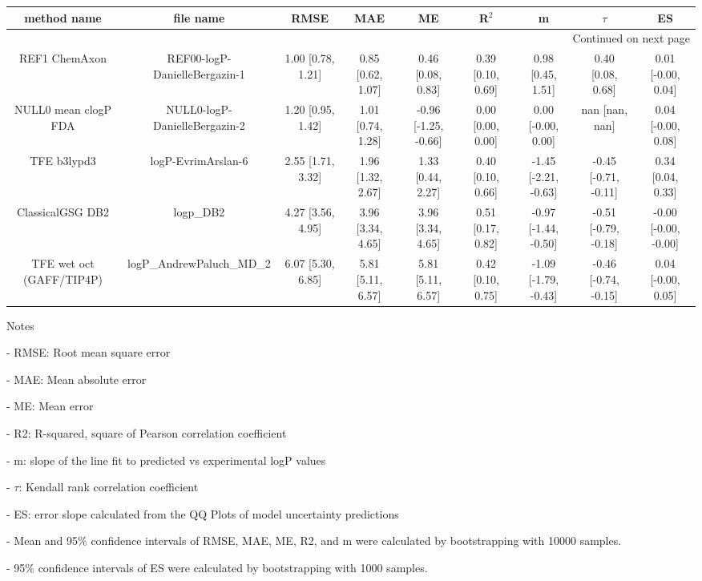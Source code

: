 \documentclass{article}
\begin{document}
\begin{center}
\scriptsize
\begin{longtable}{|ccccccccc|}
\toprule
              method name &                      file name &               RMSE &                MAE &                    ME &              R$^2$ &                     m &                $\tau$ &                    ES \\
\midrule
\endhead
\midrule
\multicolumn{9}{r}{{Continued on next page}} \\
\midrule
\endfoot

\bottomrule
\endlastfoot
            REF1 ChemAxon &  REF00-logP-DanielleBergazin-1 &  1.00 [0.78, 1.21] &  0.85 [0.62, 1.07] &     0.46 [0.08, 0.83] &  0.39 [0.10, 0.69] &     0.98 [0.45, 1.51] &     0.40 [0.08, 0.68] &    0.01 [-0.00, 0.04] \\
     NULL0 mean clogP FDA &  NULL0-logP-DanielleBergazin-2 &  1.20 [0.95, 1.42] &  1.01 [0.74, 1.28] &  -0.96 [-1.25, -0.66] &  0.00 [0.00, 0.00] &    0.00 [-0.00, 0.00] &        nan [nan, nan] &    0.04 [-0.00, 0.08] \\
              TFE b3lypd3 &             logP-EvrimArslan-6 &  2.55 [1.71, 3.32] &  1.96 [1.32, 2.67] &     1.33 [0.44, 2.27] &  0.40 [0.10, 0.66] &  -1.45 [-2.21, -0.63] &  -0.45 [-0.71, -0.11] &     0.34 [0.04, 0.33] \\
         ClassicalGSG DB2 &                      logp\_DB2 &  4.27 [3.56, 4.95] &  3.96 [3.34, 4.65] &     3.96 [3.34, 4.65] &  0.51 [0.17, 0.82] &  -0.97 [-1.44, -0.50] &  -0.51 [-0.79, -0.18] &  -0.00 [-0.00, -0.00] \\
 TFE wet oct (GAFF/TIP4P) &      logP\_AndrewPaluch\_MD\_2 &  6.07 [5.30, 6.85] &  5.81 [5.11, 6.57] &     5.81 [5.11, 6.57] &  0.42 [0.10, 0.75] &  -1.09 [-1.79, -0.43] &  -0.46 [-0.74, -0.15] &    0.04 [-0.00, 0.05] \\
\end{longtable}
\end{center}

Notes

- RMSE: Root mean square error

- MAE: Mean absolute error

- ME: Mean error

- R2: R-squared, square of Pearson correlation coefficient

- m: slope of the line fit to predicted vs experimental logP values

- $\tau$:  Kendall rank correlation coefficient

- ES: error slope calculated from the QQ Plots of model uncertainty predictions

- Mean and 95\% confidence intervals of RMSE, MAE, ME, R2, and m were calculated by bootstrapping with 10000 samples.

- 95\% confidence intervals of ES were calculated by bootstrapping with 1000 samples.\end{document}
\end{document}
